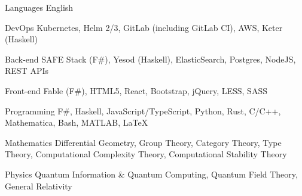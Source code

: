 
\begin{cvskills}

  \cvskill
  {Languages} %
  {English} %
  
  \cvskill
  {DevOps} %
  {Kubernetes, Helm 2/3, GitLab (including GitLab CI), AWS, Keter (Haskell)} %

  \cvskill
  {Back-end} %
  {SAFE Stack (F\#), Yesod (Haskell), ElasticSearch, Postgres, NodeJS, REST APIs} %

  \cvskill
  {Front-end} %
  {Fable (F\#), HTML5, React, Bootstrap, jQuery, LESS, SASS} %

  \cvskill
  {Programming} %
  {F\#, Haskell, JavaScript/TypeScript, Python, Rust, C/C++, Mathematica, Bash, MATLAB, \LaTeX} %

  \cvskill
  {Mathematics}
  {Differential Geometry, Group Theory, Category Theory, Type Theory,
    Computational Complexity Theory, Computational Stability Theory}

  \cvskill
  {Physics}
  {Quantum Information \& Quantum Computing, Quantum Field Theory, General Relativity}

\end{cvskills}
